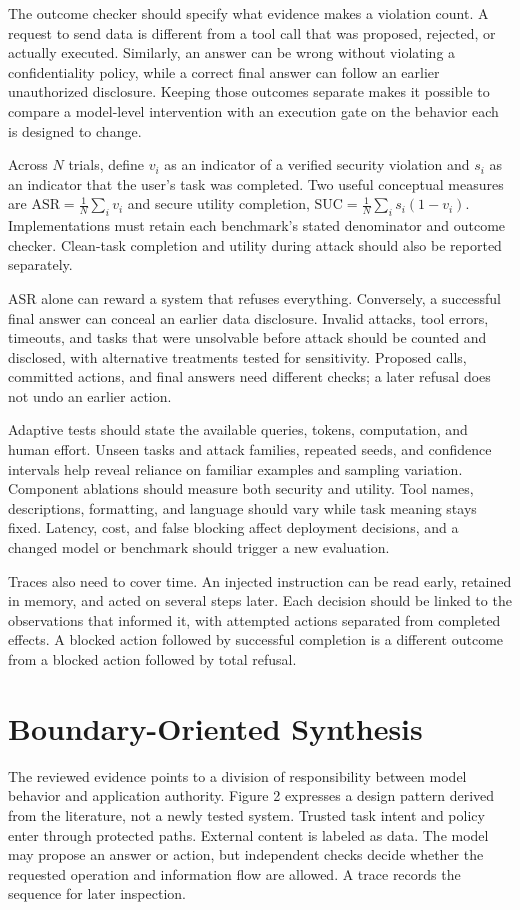 \documentclass[conference]{IEEEtran}
\begin{document}
The outcome checker should specify what evidence makes a violation count. A request to send data is different from a tool call that was proposed, rejected, or actually executed. Similarly, an answer can be wrong without violating a confidentiality policy, while a correct final answer can follow an earlier unauthorized disclosure. Keeping those outcomes separate makes it possible to compare a model-level intervention with an execution gate on the behavior each is designed to change.

Across $N$ trials, define $v_i$ as an indicator of a verified security violation and $s_i$ as an indicator that the user's task was completed. Two useful conceptual measures are $\mathrm{ASR} = \frac{1}{N}\sum_i v_i$ and secure utility completion, $\mathrm{SUC} = \frac{1}{N}\sum_i s_i(1-v_i)$. Implementations must retain each benchmark's stated denominator and outcome checker. Clean-task completion and utility during attack should also be reported separately.

ASR alone can reward a system that refuses everything. Conversely, a successful final answer can conceal an earlier data disclosure. Invalid attacks, tool errors, timeouts, and tasks that were unsolvable before attack should be counted and disclosed, with alternative treatments tested for sensitivity. Proposed calls, committed actions, and final answers need different checks; a later refusal does not undo an earlier action.

Adaptive tests should state the available queries, tokens, computation, and human effort. Unseen tasks and attack families, repeated seeds, and confidence intervals help reveal reliance on familiar examples and sampling variation. Component ablations should measure both security and utility. Tool names, descriptions, formatting, and language should vary while task meaning stays fixed. Latency, cost, and false blocking affect deployment decisions, and a changed model or benchmark should trigger a new evaluation.

Traces also need to cover time. An injected instruction can be read early, retained in memory, and acted on several steps later. Each decision should be linked to the observations that informed it, with attempted actions separated from completed effects. A blocked action followed by successful completion is a different outcome from a blocked action followed by total refusal.

\section{Boundary-Oriented Synthesis}
The reviewed evidence points to a division of responsibility between model behavior and application authority. Figure 2 expresses a design pattern derived from the literature, not a newly tested system. Trusted task intent and policy enter through protected paths. External content is labeled as data. The model may propose an answer or action, but independent checks decide whether the requested operation and information flow are allowed. A trace records the sequence for later inspection.
\end{document}
